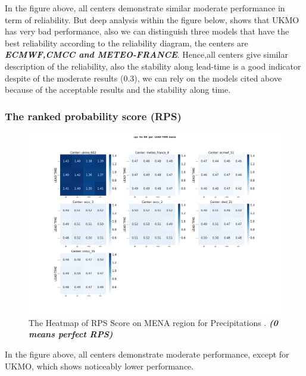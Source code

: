In the figure above, all centers demonstrate similar moderate performance in term of reliability. But deep analysis within the figure below, shows that UKMO has very bad performance, also we can distinguish three models that have the best reliability according to the reliability diagram, the centers are \textbf{\textit{ECMWF,CMCC and METEO-FRANCE}}. Hence,all centers give similar description of the reliability, also the stability along lead-time is a good indicator despite of the moderate results (0.3), we can rely on the models cited above because of the acceptable results and the stability along time.




\subsubsection{The ranked probability score (RPS)}


\begin{figure}[H]
    \centering
    \includegraphics[scale=0.25]{plots/prob/rps/rps_RR_mena.png}
    \caption{The Heatmap of  RPS Score on MENA region for Precipitations    . \textbf{\textit{(0 means perfect RPS)}}}
\end{figure}

In the figure above, all centers demonstrate moderate performance, except for UKMO, which shows noticeably lower performance. 



